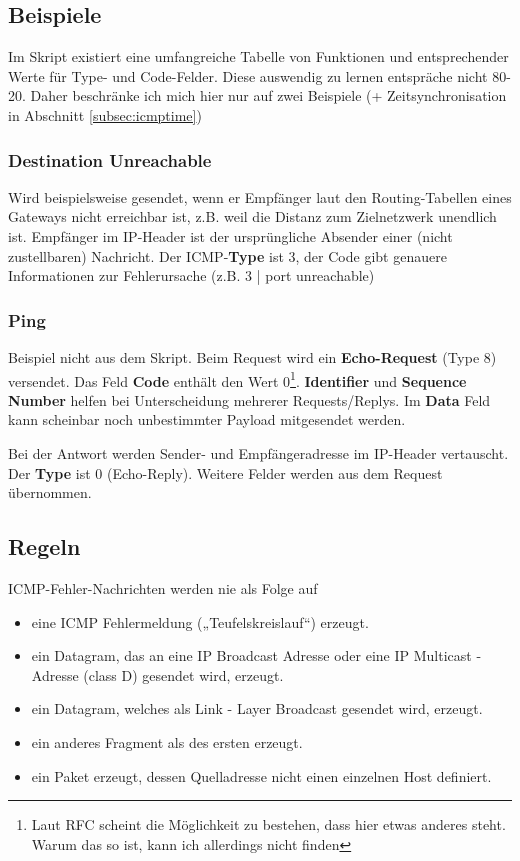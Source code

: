 \documentclass{article} %
\begin{document}
\subsection{Beispiele}
Im Skript existiert eine umfangreiche Tabelle von Funktionen und entsprechender Werte für Type- und Code-Felder.
Diese auswendig zu lernen entspräche nicht 80-20.
Daher beschränke ich mich hier nur auf zwei Beispiele (+ Zeitsynchronisation in Abschnitt \ref{subsec:icmptime})

\subsubsection{Destination Unreachable}
Wird beispielsweise gesendet, wenn er Empfänger laut den Routing-Tabellen eines Gateways nicht erreichbar ist, z.B. weil die Distanz zum Zielnetzwerk unendlich ist.
Empfänger im IP-Header ist der ursprüngliche Absender einer (nicht zustellbaren) Nachricht.
Der ICMP-\textbf{Type} ist 3, der Code gibt genauere Informationen zur Fehlerursache (z.B. 3 | port unreachable)
\subsubsection{Ping}
Beispiel nicht aus dem Skript.
Beim Request wird ein \textbf{Echo-Request} (Type 8) versendet.
Das Feld \textbf{Code} enthält den Wert 0\footnote{Laut RFC scheint die Möglichkeit zu bestehen, dass hier etwas anderes steht. Warum das so ist, kann ich allerdings nicht finden}.
\textbf{Identifier} und \textbf{Sequence Number} helfen bei Unterscheidung mehrerer Requests/Replys.
Im \textbf{Data} Feld kann scheinbar noch unbestimmter Payload mitgesendet werden.

Bei der Antwort werden Sender- und Empfängeradresse im IP-Header vertauscht.
Der \textbf{Type} ist 0 (Echo-Reply).
Weitere Felder werden aus dem Request übernommen.

\subsection{Regeln}
ICMP-Fehler-Nachrichten werden nie als Folge auf
\begin{itemize}
\item  eine ICMP Fehlermeldung („Teufelskreislauf“) erzeugt.
\item  ein Datagram, das an eine IP Broadcast Adresse oder eine IP
Multicast - Adresse (class D) gesendet wird, erzeugt.
\item  ein Datagram, welches als Link - Layer Broadcast gesendet
wird, erzeugt.
\item  ein anderes Fragment als des ersten erzeugt.
\item  ein Paket erzeugt, dessen Quelladresse nicht einen einzelnen Host definiert.
\end{itemize}
\end{document}
